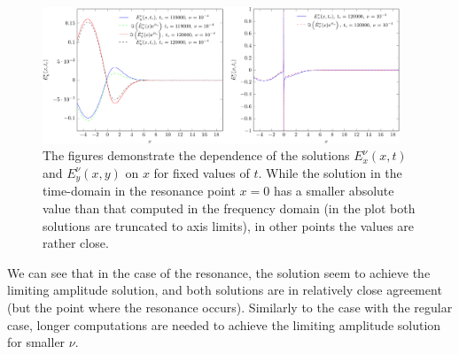\begin{figure}
\includegraphics[width=0.95\textwidth]{res/ex_fixed_t_1e4_2-crop.pdf}
\caption{The figures demonstrate the dependence of the solutions 
$E_x^{\nu}(x,t)$ and $E_y^{\nu}(x,y)$ on $x$ for fixed values of $t$. While the solution in the time-domain 
in the resonance point $x=0$ has a smaller absolute value than that computed in the frequency domain (in the plot both solutions are truncated to 
axis limits), in other points the values are rather close. }
\label{fig:resonance_nus_eyx_t}
\end{figure}

We can see that in the case of the resonance, the solution seem to achieve the limiting amplitude solution, 
and both solutions are in relatively close agreement (but the point where the resonance occurs). 
Similarly to the case with the regular case, 
longer computations are needed to achieve the limiting amplitude solution  
for smaller $\nu$.

